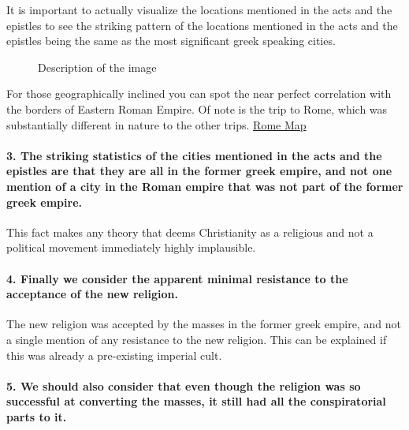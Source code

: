 It is important to actually visualize the locations mentioned in the acts and the epistles to see the striking pattern of the locations mentioned in the acts and the epistles being the same as the most significant greek speaking cities.

\begin{figure}
\centering
{}
\caption{Description of the image}
\end{figure}

For those geographically inclined you can spot the near perfect correlation with the borders of Eastern Roman Empire.
Of note is the trip to Rome, which was substantially different in nature to the other trips.
\href{https://en.wikipedia.org/wiki/Byzantine_Empire_under_the_Theodosian_dynasty\#/media/File:4KTHEODOSIAN.png}{Rome Map}

\paragraph{3.
The striking statistics of the cities mentioned in the acts and the epistles are that they are all in the former greek empire, and not one mention of a city in the Roman empire that was not part of the former greek empire.}\label{par:the-striking-statistics-of-the-cities-mentioned-in-the-acts-and-the-epistles-are-that-they-are-all-in-the-former-greek-empire-and-not-one-mention-of-a-city-in-the-roman-empire-that-was-not-part-of-the-former-greek-empire.}

This fact makes any theory that deems Christianity as a religious and not a political movement immediately highly implausible.

\paragraph{4.
Finally we consider the apparent minimal resistance to the acceptance of the new religion.}\label{par:finally-we-consider-the-apparent-minimal-resistance-to-the-acceptance-of-the-new-religion.}

The new religion was accepted by the masses in the former greek empire, and not a single mention of any resistance to the new religion.
This can be explained if this was already a pre-existing imperial cult.

\paragraph{5.
We should also consider that even though the religion was so successful at converting the masses, it still had all the conspiratorial parts to it.}\label{par:we-should-also-consider-that-even-though-the-religion-was-so-successful-at-converting-the-masses-it-still-had-all-the-conspiratorial-parts-to-it.}

